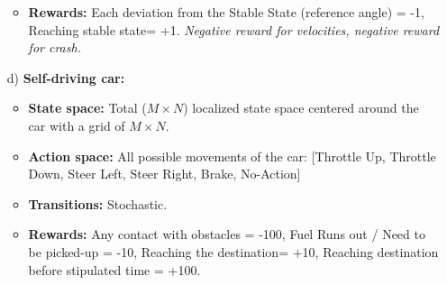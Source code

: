 \documentclass{article}
\begin{document}
\begin{enumerate}
\begin{itemize}
		\item \textbf{Rewards:} Each deviation from the Stable State (reference angle) = -1, Reaching stable state= +1. \textit{Negative reward for velocities, negative reward for crash.}			
	\end{itemize}
	\item[d)]\textbf{Self-driving car:}
	\begin{itemize}
		\item \textbf{State space:} Total ($M\times N$) localized state space centered around the car with a grid of $M\times N$. 
		\item \textbf{Action space:}  All possible movements of the car:
		[Throttle Up, Throttle Down, Steer Left, Steer Right, Brake, No-Action]			
		\item \textbf{Transitions:} Stochastic.
		\item \textbf{Rewards:} Any contact with obstacles = -100, Fuel Runs out / Need to be picked-up = -10, Reaching the destination= +10, Reaching destination before stipulated time = +100.	
	\end{itemize}
\end{enumerate}
\end{document}
